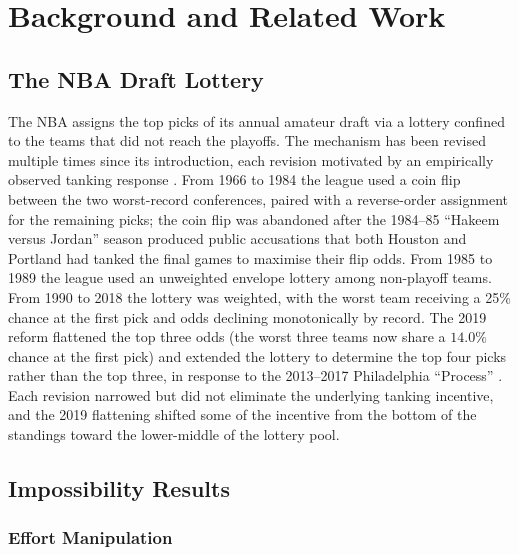 \section{Background and Related Work}
\label{sec:background}

%

\subsection{The NBA Draft Lottery}
\label{sec:lottery-history}

The NBA assigns the top picks of its annual amateur draft via a lottery confined to the teams that did not reach the playoffs. The mechanism has been revised multiple times since its introduction, each revision motivated by an empirically observed tanking response \citep{nbalotteryhistory}. From 1966 to 1984 the league used a coin flip between the two worst-record conferences, paired with a reverse-order assignment for the remaining picks; the coin flip was abandoned after the 1984--85 ``Hakeem versus Jordan'' season produced public accusations that both Houston and Portland had tanked the final games to maximise their flip odds. From 1985 to 1989 the league used an unweighted envelope lottery among non-playoff teams. From 1990 to 2018 the lottery was weighted, with the worst team receiving a 25\% chance at the first pick and odds declining monotonically by record. The 2019 reform flattened the top three odds (the worst three teams now share a $14.0\%$ chance at the first pick) and extended the lottery to determine the top four picks rather than the top three, in response to the 2013--2017 Philadelphia ``Process'' \citep{nba2019lotteryreform}. Each revision narrowed but did not eliminate the underlying tanking incentive, and the 2019 flattening shifted some of the incentive from the bottom of the standings toward the lower-middle of the lottery pool.

\subsection{Impossibility Results}

\subsubsection{Effort Manipulation}

